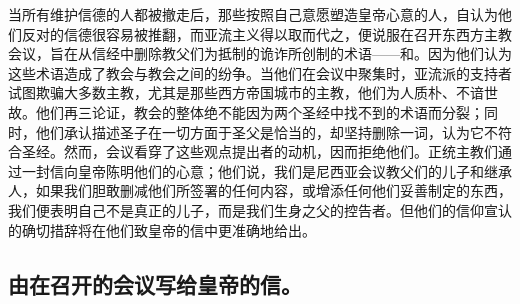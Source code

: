 当所有维护信德的人都被撤走后，那些按照自己意愿塑造皇帝心意的人，自认为他们反对的信德很容易被推翻，而亚流主义得以取而代之，便说服在召开东西方主教会议，旨在从信经中删除教父们为抵制的诡诈所创制的术语——和。因为他们认为这些术语造成了教会与教会之间的纷争。当他们在会议中聚集时，亚流派的支持者试图欺骗大多数主教，尤其是那些西方帝国城市的主教，他们为人质朴、不谙世故。他们再三论证，教会的整体绝不能因为两个圣经中找不到的术语而分裂；同时，他们承认描述圣子在一切方面于圣父是恰当的，却坚持删除一词，认为它不符合圣经。然而，会议看穿了这些观点提出者的动机，因而拒绝他们。正统主教们通过一封信向皇帝陈明他们的心意；他们说，我们是尼西亚会议教父们的儿子和继承人，如果我们胆敢删减他们所签署的任何内容，或增添任何他们妥善制定的东西，我们便表明自己不是真正的儿子，而是我们生身之父的控告者。但他们的信仰宣认的确切措辞将在他们致皇帝的信中更准确地给出。\par


\subsection{由在召开的会议写给皇帝的信。}

